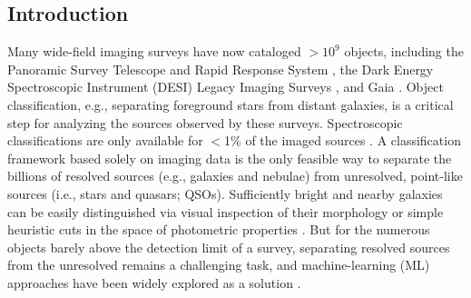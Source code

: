 \documentclass[twocolumn,tighten]{aastex631}
\begin{document}
\begin{CJK*}{UTF8}{gbsn}

\section{Introduction} \label{sec:intro}

Many wide-field imaging surveys have now cataloged $>$$10^9$ objects, including the Panoramic Survey Telescope and Rapid Response System \citep[Pan-STARRS;][]{PanSTARRS_2016}, the Dark Energy Spectroscopic Instrument (DESI) Legacy Imaging Surveys \citep[LS;][]{LS_2019}, and Gaia \citep{Gaia_2016,GaiaDR3_2023}. Object classification, e.g., separating foreground stars from distant galaxies, is a critical step for analyzing the sources observed by these surveys. Spectroscopic classifications are only available for $<$1\% of the imaged sources \citep{DESI_DR1_2025}. A classification framework based solely on imaging data is the only feasible way to separate the billions of resolved sources (e.g., galaxies and nebulae) from unresolved, point-like sources (i.e., stars and quasars; QSOs). Sufficiently bright and nearby galaxies can be easily distinguished via visual inspection of their morphology \citep{Lintott_2008} or simple heuristic cuts in the space of photometric properties \citep[e.g.,][]{Kron_1980, Leauthaud_2007}. But for the numerous objects barely above the detection limit of a survey, separating resolved sources from the unresolved remains a challenging task, and machine-learning (ML) approaches have been widely explored as a solution \citep[e.g., \citealp{SExtractor_1996,Philip_2002, Ball_2006, Henrion_2011, Vasconcellos_2011, Kovacs_2015, Miller_2017, Tachibana_2018, Stoppa_2023, Miller_2021, Beck_2022}; see][for a comprehensive review]{Sevilla-Noarbe_2018}.


\end{CJK*}
\end{document}
